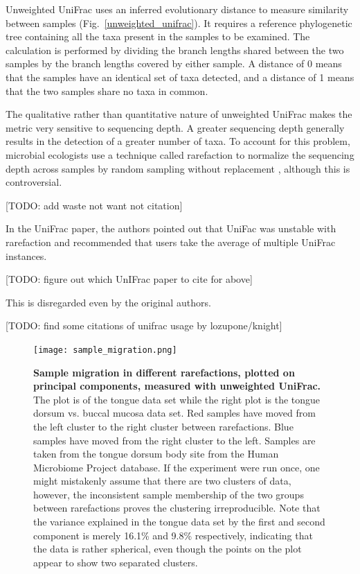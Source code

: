 Unweighted UniFrac uses an inferred evolutionary distance to measure similarity between samples (Fig.~\ref{unweighted_unifrac}). It requires a reference phylogenetic tree containing all the taxa present in the samples to be examined. The calculation is performed by dividing the branch lengths shared between the two samples by the branch lengths covered by either sample. A distance of 0 means that the samples have an identical set of taxa detected, and a distance of 1 means that the two samples share no taxa in common.

The qualitative rather than quantitative nature of unweighted UniFrac makes the metric very sensitive to sequencing depth. A greater sequencing depth generally results in the detection of a greater number of taxa. To account for this problem, microbial ecologists use a technique called rarefaction to normalize the sequencing depth across samples by random sampling without replacement \cite{de2011evaluation}, although this is controversial.

[TODO: add waste not want not citation]

In the UniFrac paper, the authors pointed out that UniFac was unstable with rarefaction and recommended that users take the average of multiple UniFrac instances.

[TODO: figure out which UnIFrac paper to cite for above]

This is disregarded even by the original authors.

[TODO: find some citations of unifrac usage by lozupone/knight]

\begin{figure}[h]
\texttt{[image: sample\_migration.png]}
\caption[Sample migration in different rarefactions, plotted on principal components, measured with unweighted UniFrac.]{{\bf Sample migration in different rarefactions, plotted on principal components, measured with unweighted UniFrac.}
The plot is of the tongue data set while the right plot is the tongue dorsum vs. buccal mucosa data set. Red samples have moved from the left cluster to the right cluster between rarefactions. Blue samples have moved from the right cluster to the left. Samples are taken from the tongue dorsum body site from the Human Microbiome Project database. If the experiment were run once, one might mistakenly assume that there are two clusters of data, however, the inconsistent sample membership of the two groups between rarefactions proves the clustering irreproducible. Note that the variance explained in the tongue data set by the first and second component is merely 16.1\% and 9.8\% respectively, indicating that the data is rather spherical, even though the points on the plot appear to show two separated clusters.}
\label{sample_migration}
\end{figure}

